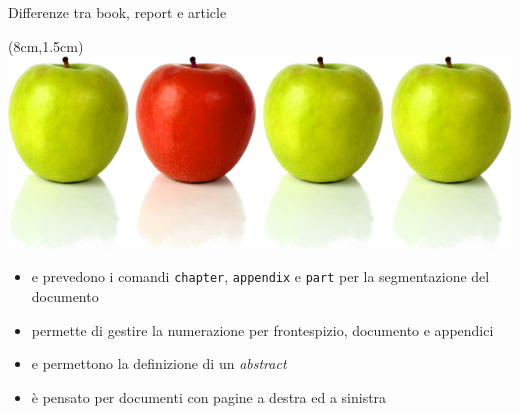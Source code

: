\begin{frame}{Differenze tra book, report e article}

\begin{textblock*}{5cm}(8cm,1.5cm)
      \includegraphics[scale=0.20]{res/images/differenze}
\end{textblock*}

\begin{itemize}
	\item \mbook{} e \mreport{} prevedono i comandi \texttt{chapter}, 
	\texttt{appendix} e \texttt{part} per la segmentazione del documento
	\item \mbook{} permette di gestire la numerazione per frontespizio,
	documento e appendici
	\item \mreport{} e \marticle{} permettono la definizione di un 
	\emph{abstract}
	\item \mbook{} è pensato per documenti con pagine a destra ed a sinistra
\end{itemize}

\end{frame}